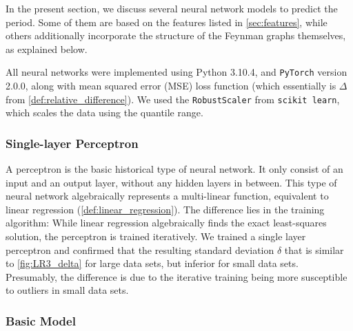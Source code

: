 \documentclass[11pt]{scrartcl}
\numberwithin{equation}{section}
\begin{document}
In the present section, we discuss several neural network models  to predict the  period. Some of them are based on the features listed in \cref{sec:features}, while others additionally incorporate  the structure of the Feynman graphs themselves, as explained below. 

All neural networks  were implemented using Python 3.10.4, and \texttt{PyTorch} \cite{paszke_pytorch_2019} version 2.0.0, along with mean squared error (MSE) loss function (which essentially is $\Delta$ from \cref{def:relative_difference}). We used the \texttt{RobustScaler} from \texttt{scikit learn}\cite{pedregosa_scikitlearn_2012}, which scales the data using the quantile range. 

\subsubsection{Single-layer Perceptron}

A  perceptron \cite{rosenblatt_perceptron_1957} is the basic historical type of  neural network. It only consist of an input and an output layer, without any hidden layers in between.  This type of neural network algebraically represents a multi-linear function, equivalent to linear regression (\cref{def:linear_regression}). The difference lies in the training algorithm: While linear regression algebraically finds the exact least-squares solution, the perceptron is trained iteratively. We trained a single layer perceptron and confirmed that the resulting standard deviation $\delta$  that is similar to \cref{fig:LR3_delta} for large data sets, but inferior for small data sets. Presumably, the difference is due to the iterative training being more susceptible to  outliers in small data sets.
 


\subsubsection{Basic Model}\label{sec:basicmodel}
\end{document}

